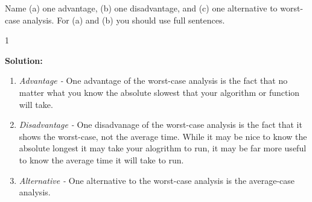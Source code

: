 \documentclass[9pt]{article}
\def\solutions{1}
\newcommand{\ben}{\begin{enumerate}}
\newcommand{\een}{\end{enumerate}}
\begin{document}
\item Name (a) one advantage, (b) one disadvantage, and (c) one alternative to worst-case analysis. For (a) and (b) you should use full sentences.

  \if\solutions1
  \vspace{2mm}
  
  \textbf{Solution:}   \\
\ben
	\item \textit{Advantage - } One advantage of the worst-case analysis is the fact that no matter what you know the absolute slowest that your algorithm or function will take. 
	\\
	\item \textit{Disadvantage - } One disadvanage of the worst-case analysis is the fact that it shows the worst-case, not the average time. While it may be nice to know the absolute longest it may take your alogrithm to run, it may be far more useful to know the average time it will take to run.
	\\
	\item \textit{Alternative - } One alternative to the worst-case analysis is the average-case analysis.
\een

\fi

\newpage




\vspace{5mm}
\end{document}

